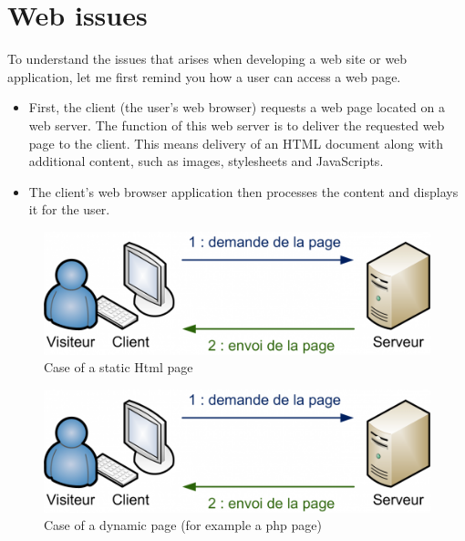 \section{Web issues}

To understand the issues that arises when developing a web site or web application, let me first remind you how a user can access a web page.
\begin{itemize}
\item First, the client (the user's web browser) requests a web page located on a web server. The function of this web server is to deliver the requested web page to the client. This means delivery of an HTML document along with additional content, 
such as images, stylesheets and JavaScripts.
\item The client's web browser application then processes the content and displays it for the user.  
\end{itemize}

\begin{figure}[!l]
\centering
\includegraphics[width=.55\textwidth]{img/static.png}
\caption{Case of a static Html page}
\label{figure:static page}
\end{figure}
\begin{figure}[!r]
\centering
\includegraphics[width=.55\textwidth]{img/static.png}
\caption{Case of a dynamic page (for example a php page)}
\label{figure:dynamic page}
\end{figure}

